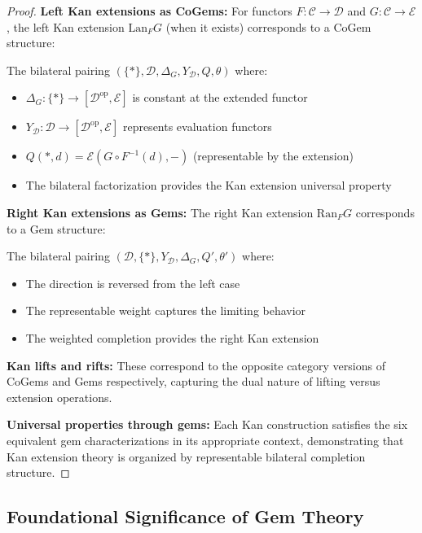 \documentclass[11pt]{article}
\theoremstyle{plain}
\theoremstyle{definition}
\theoremstyle{remark}
\newcommand{\C}{\mathcal{C}}
\newcommand{\D}{\mathcal{D}}
\newcommand{\E}{\mathcal{E}}
\newcommand{\op}{\mathrm{op}}
\begin{document}
\begin{proof}
\textbf{Left Kan extensions as CoGems:}
For functors $F : \C \to \D$ and $G : \C \to \E$, the left Kan extension $\text{Lan}_F G$ (when it exists) corresponds to a CoGem structure:

The bilateral pairing $(\{\ast\}, \D, \Delta_G, Y_\D, Q, \theta)$ where:
\begin{itemize}
\item $\Delta_G : \{\ast\} \to [\D^{\op}, \E]$ is constant at the extended functor
\item $Y_\D : \D \to [\D^{\op}, \E]$ represents evaluation functors
\item $Q(\ast, d) = \E(G \circ F^{-1}(d), -)$ (representable by the extension)
\item The bilateral factorization provides the Kan extension universal property
\end{itemize}

\textbf{Right Kan extensions as Gems:}
The right Kan extension $\text{Ran}_F G$ corresponds to a Gem structure:

The bilateral pairing $(\D, \{\ast\}, Y_\D, \Delta_G, Q', \theta')$ where:
\begin{itemize}
\item The direction is reversed from the left case
\item The representable weight captures the limiting behavior
\item The weighted completion provides the right Kan extension
\end{itemize}

\textbf{Kan lifts and rifts:}
These correspond to the opposite category versions of CoGems and Gems respectively, capturing the dual nature of lifting versus extension operations.

\textbf{Universal properties through gems:}
Each Kan construction satisfies the six equivalent gem characterizations in its appropriate context, demonstrating that Kan extension theory is organized by representable bilateral completion structure.
\end{proof}

\subsection{Foundational Significance of Gem Theory}
\end{document}
